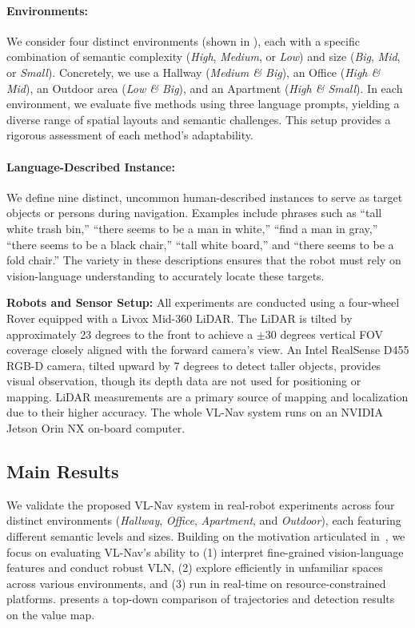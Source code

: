 \paragraph{Environments:}
We consider four distinct environments (shown in ), each with a specific combination of semantic complexity (\textit{High}, \textit{Medium}, or \textit{Low}) and size (\textit{Big}, \textit{Mid}, or \textit{Small}). Concretely, we use a Hallway (\textit{Medium \& Big}), an Office (\textit{High \& Mid}), an Outdoor area (\textit{Low \& Big}), and an Apartment (\textit{High \& Small}). In each environment, we evaluate five methods using three language prompts, yielding a diverse range of spatial layouts and semantic challenges. This setup provides a rigorous assessment of each method’s adaptability.

\paragraph{Language-Described Instance:}
We define nine distinct, uncommon human-described instances to serve as target objects or persons during navigation. Examples include phrases such as “tall white trash bin,” “there seems to be a man in white,” “find a man in gray,” “there seems to be a black chair,” “tall white board,” and “there seems to be a fold chair.” The variety in these descriptions ensures that the robot must rely on vision-language understanding to accurately locate these targets.

\noindent\textbf{Robots and Sensor Setup:} 
All experiments are conducted using a four-wheel Rover equipped with a Livox Mid-360 LiDAR. The LiDAR is tilted by approximately 23 degrees to the front to achieve a $\pm 30$ degrees vertical FOV coverage closely aligned with the forward camera’s view. An Intel RealSense D455 RGB-D camera, tilted upward by 7 degrees to detect taller objects, provides visual observation, though its depth data are not used for positioning or mapping. LiDAR measurements are a primary source of mapping and localization due to their higher accuracy. The whole VL-Nav system runs on an NVIDIA Jetson Orin NX on-board computer.




\subsection{Main Results}
\label{sec:main_results}

We validate the proposed VL-Nav system in real-robot experiments across four distinct environments (\textit{Hallway}, \textit{Office}, \textit{Apartment}, and \textit{Outdoor}), each featuring different semantic levels and sizes. Building on the motivation articulated in~, we focus on evaluating VL-Nav’s ability to (1) interpret fine-grained vision-language features and conduct robust VLN, (2) explore efficiently in unfamiliar spaces across various environments, and (3) run in real-time on resource-constrained platforms.  presents a top-down comparison of trajectories and detection results on the value map.

